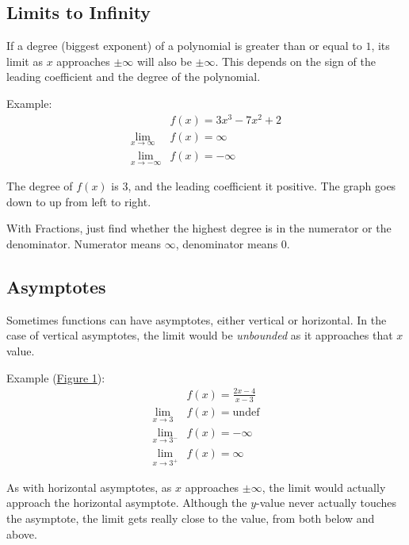 \documentclass[12pt]{article}
\begin{document}
        \subsection{Limits to Infinity}

            If a degree (biggest exponent) of a polynomial is greater than or equal to $1$, its limit as $x$ approaches $\pm\infty$ will also be $\pm\infty$. This depends on the sign of the leading coefficient and the degree of the polynomial.

            \noindent Example:
            \begin{align*}
                &f(x) = 3x^3 - 7x^2 + 2 \\
                \lim_{x \to \infty} &f(x) = \infty \\
                \lim_{x \to -\infty} &f(x) = -\infty
            \end{align*}

            The degree of $f(x)$ is $3$, and the leading coefficient it positive. The graph goes down to up from left to right.

            With Fractions, just find whether the highest degree is in the numerator or the denominator. Numerator means $\infty$, denominator means $0$.

        \subsection{Asymptotes}
            Sometimes functions can have asymptotes, either vertical or horizontal. In the case of vertical asymptotes, the limit would be \textit{unbounded} as it approaches that $x$ value.

            \noindent Example (\hyperref[fig:limasymptote]{Figure 1}):
            \begin{align*}
                &f(x) = \frac{2x-4}{x-3} \\
                \lim_{x \to 3} &f(x) = \text{undef} \\
                \lim_{x \to 3^-} &f(x) = -\infty \\
                \lim_{x \to 3^+} &f(x) = \infty
            \end{align*}

            As with horizontal asymptotes, as $x$ approaches $\pm \infty$, the limit would actually approach the horizontal asymptote. Although the $y$-value never actually touches the asymptote, the limit gets really close to the value, from both below and above.
\end{document}
